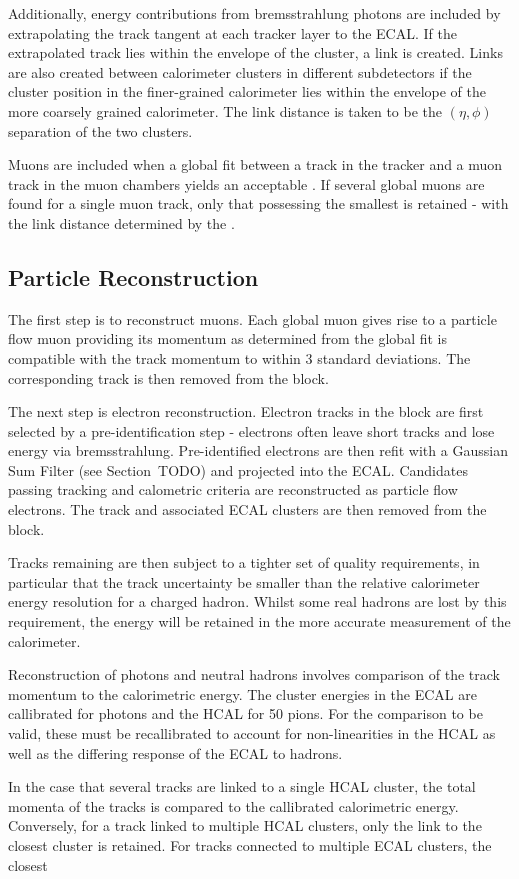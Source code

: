 Additionally, energy contributions from bremsstrahlung photons are included by
extrapolating the track tangent at each tracker layer to the \ac{ECAL}. If the
extrapolated track lies within the envelope of the cluster, a link is created.
Links are also created between calorimeter clusters in different subdetectors if
the cluster position in the finer-grained calorimeter lies within the envelope
of the more coarsely grained calorimeter. The link distance is taken to be the
$(\eta, \phi)$ separation of the two clusters.

Muons are included when a global fit between a track in the tracker and a muon
track in the muon chambers yields an acceptable \chisq. If several global muons
are found for a single muon track, only that possessing the smallest \chisq is
retained - with the link distance determined by the \chisq.

\subsection{Particle Reconstruction}
The first step is to reconstruct muons. Each global muon gives rise to a
particle flow muon providing its momentum as determined from the global fit is
compatible with the track momentum to within 3 standard deviations. The
corresponding track is then removed from the block.

The next step is electron reconstruction. Electron tracks in the block are first
selected by a pre-identification step - electrons often leave short tracks and
lose energy via bremsstrahlung. Pre-identified electrons are then refit with a
Gaussian Sum Filter (see Section~TODO) and projected into the \ac{ECAL}.
Candidates passing tracking and calometric criteria are reconstructed as
particle flow electrons. The track and associated \ac{ECAL} clusters are then
removed from the block.

Tracks remaining are then subject to a tighter set of quality requirements, in
particular that the track \Pt uncertainty be smaller than the relative
calorimeter energy resolution for a charged hadron. Whilst some real hadrons are
lost by this requirement, the energy will be retained in the more accurate
measurement of the calorimeter.

Reconstruction of photons and neutral hadrons involves comparison of the track
momentum to the calorimetric energy. The cluster energies in the \ac{ECAL} are
callibrated for photons and the \ac{HCAL} for \unit{50}{\GeV} pions. For the
comparison to be valid, these must be recallibrated to account for
non-linearities in the \ac{HCAL} as well as the differing response of the
\ac{ECAL} to hadrons.

In the case that several tracks are linked to a single \ac{HCAL} cluster, the
total momenta of the tracks is compared to the callibrated calorimetric energy.
Conversely, for a track linked to multiple \ac{HCAL} clusters, only the link to
the closest cluster is retained. For tracks connected to multiple \ac{ECAL}
clusters, the closest
